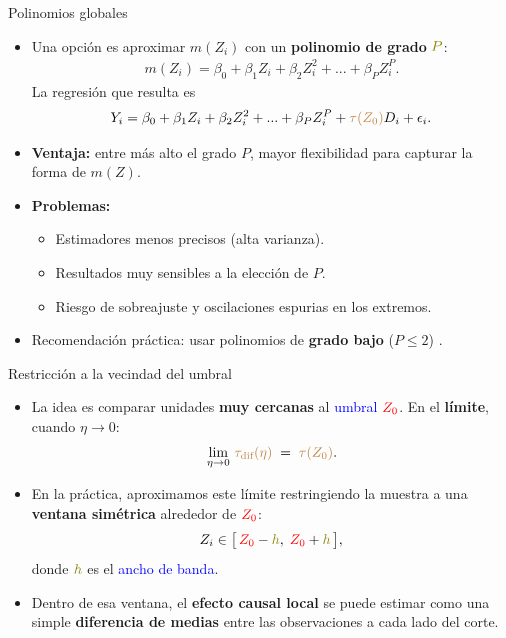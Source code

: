 \documentclass[10pt, xcolor=dvipsnames]{beamer}
\begin{document}
\begin{frame}{Polinomios globales}
\begin{itemize}
    \item Una opción es aproximar $m(Z_i)$ con un \textbf{polinomio de grado} $\textcolor{olive}{P}$:
    \begin{align*}
        m(Z_i) = \beta_0 + \beta_1 Z_i + \beta_2 Z_i^2 + ... + \beta_P Z_i^P.
    \end{align*}
    La regresión que resulta es
    \begin{align*}
        Y_i = \beta_0 + \beta_1 Z_i + \beta_2 Z_i^2 + ... + \beta_P Z_i^P + \textcolor{brown}{\tau(Z_0)} D_i + \epsilon_i.
    \end{align*}
    \item \textbf{Ventaja:} entre más alto el grado $P$, mayor flexibilidad para capturar la forma de $m(Z)$. \smallspace
    \item \textbf{Problemas:}
    \begin{itemize}
        \item Estimadores menos precisos (alta varianza).
        \item Resultados muy sensibles a la elección de $P$.
        \item Riesgo de sobreajuste y oscilaciones espurias en los extremos. \smallspace
    \end{itemize}
    \item Recomendación práctica: usar polinomios de \textbf{grado bajo} (\(P \leq 2\)) \citep{gelman2014high}.
\end{itemize}
\end{frame}


\begin{frame}{Restricción a la vecindad del umbral}
\begin{itemize}
    \item La idea es comparar unidades \textbf{muy cercanas} al \textcolor{blue}{umbral} $\textcolor{red}{Z_0}$. En el \textbf{límite}, cuando $\eta \to 0$:
    \[
        \lim_{\eta \to 0} \,\textcolor{brown}{\tau_{\text{dif}}(\eta)} 
        \;=\; \textcolor{brown}{\tau(Z_0)}.
    \]
    \item En la práctica, aproximamos este límite restringiendo la muestra a una \textbf{ventana simétrica} alrededor de $\textcolor{red}{Z_0}$:
    \[
        Z_i \in \big[\,\textcolor{red}{Z_0}-\textcolor{olive}{h},\;\textcolor{red}{Z_0}+\textcolor{olive}{h}\,\big],
    \]
    donde $\textcolor{olive}{h}$ es el \textcolor{blue}{ancho de banda}.
    \item Dentro de esa ventana, el \textbf{efecto causal local} se puede estimar como una simple \textbf{diferencia de medias} entre las observaciones a cada lado del corte.
\end{itemize}
\end{frame}
\end{document}

